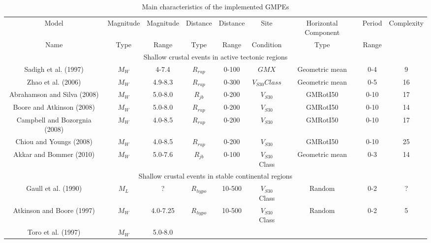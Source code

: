 \begin{landscape}
\begin{table}[!t]
\renewcommand{\arraystretch}{1.3}
\caption{Main characteristics of the implemented GMPEs}
\label{GMPEs} \centering
\begin{tabular}{|c|c|c|c|c|c|c|c|c|}
\hline {\footnotesize Model} & {\footnotesize Magnitude} &
{\footnotesize Magnitude} & {\footnotesize Distance} &
{\footnotesize Distance} & {\footnotesize Site}
& {\footnotesize Horizontal Component} & {\footnotesize Period} & {\footnotesize Complexity}  \\
{\footnotesize Name} & {\footnotesize Type} & {\footnotesize Range}
& {\footnotesize Type} & {\footnotesize Range} & {\footnotesize
Condition}
& {\footnotesize Type} & {\footnotesize Range} &\\
\hline \multicolumn{9}{|c|}{Shallow crustal events in active
tectonic regions}\\
\hline {\footnotesize Sadigh et al. (1997)} & $M_W$ & 4-7.4 &
$R_{rup}$ &
0-100& $GMX$ & Geometric mean & 0-4 & 9\\
\hline {\footnotesize Zhao et al. (2006)} & $M_W$ & 4.9-8.3 &
$R_{rup}$ &
0-300& $V_{S30} Class$ & Geometric mean & 0-5 & 16\\
\hline {\footnotesize Abrahamson and Silva (2008)} & $M_W$ & 5.0-8.0
&
$R_{jb}$ & 0-200 & $V_{S30}$ & GMRotI50 & 0-10 & 17\\
\hline {\footnotesize Boore and Atkinson (2008)} & $M_W$ & 5.0-8.0 &
$R_{rup}$ & 0-200 & $V_{S30}$ & GMRotI50 & 0-10 & 14\\
\hline {\footnotesize Campbell and Bozorgnia (2008)} & $M_W$ &
4.0-8.5 &
$R_{rup}$ & 0-200 & $V_{S30}$ & GMRotI50 & 0-10 & 17\\
\hline {\footnotesize Chiou and Youngs (2008)} & $M_W$ & 4.0-8.5 &
$R_{rup}$ & 0-200 & $V_{S30}$ & GMRotI50 & 0-10 & 25\\
\hline {\footnotesize Akkar and Bommer (2010)} & $M_W$ & 5.0-7.6 &
$R_{jb}$
& 0-100& $V_{S30}$ Class & Geometric mean & 0-3 & 14\\
\hline \multicolumn{9}{|c|}{Shallow crustal events in stable
continental regions}\\
\hline {\footnotesize Gaull et al. (1990)} & $M_L$ & ?  &
$R_{hypo}$& 10-500& $V_{S30}$ Class & Random & 0-2 & ?\\
\hline {\footnotesize Atkinson and Boore (1997)} & $M_W$ & 4.0-7.25
&
$R_{hypo}$& 10-500& $V_{S30}$ Class & Random & 0-2 & 5\\
\hline {\footnotesize Toro et al. (1997)} & $M_W$ & 5.0-8.0 &

\end{tabular}
\end{table}
\end{landscape}
